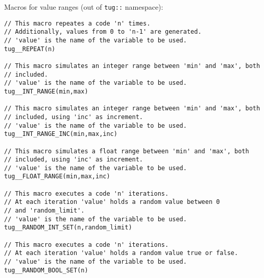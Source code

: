 Macros for value ranges (out of {\tt tug::} namespace):
%
\begin{lstlisting}
// This macro repeates a code 'n' times. 
// Additionally, values from 0 to 'n-1' are generated.
// 'value' is the name of the variable to be used.
tug__REPEAT(n)

// This macro simulates an integer range between 'min' and 'max', both
// included.
// 'value' is the name of the variable to be used.
tug__INT_RANGE(min,max)

// This macro simulates an integer range between 'min' and 'max', both
// included, using 'inc' as increment.
// 'value' is the name of the variable to be used.
tug__INT_RANGE_INC(min,max,inc)

// This macro simulates a float range between 'min' and 'max', both
// included, using 'inc' as increment.
// 'value' is the name of the variable to be used.
tug__FLOAT_RANGE(min,max,inc)

// This macro executes a code 'n' iterations. 
// At each iteration 'value' holds a random value between 0 
// and 'random_limit'.
// 'value' is the name of the variable to be used.
tug__RANDOM_INT_SET(n,random_limit)

// This macro executes a code 'n' iterations.
// At each iteration 'value' holds a random value true or false.
// 'value' is the name of the variable to be used.
tug__RANDOM_BOOL_SET(n)
\end{lstlisting}









